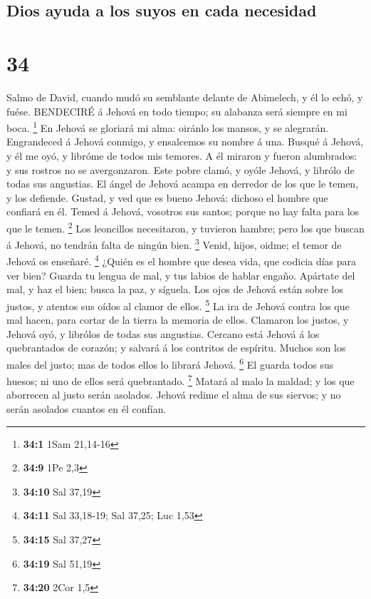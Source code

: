 \hypertarget{dios-ayuda-a-los-suyos-en-cada-necesidad}{%
\subsection{Dios ayuda a los suyos en cada
necesidad}\label{dios-ayuda-a-los-suyos-en-cada-necesidad}}

\hypertarget{section-33}{%
\section{34}\label{section-33}}

 Salmo de David, cuando mudó su semblante delante de
Abimelech, y él lo echó, y fuése. BENDECIRÉ á Jehová en todo tiempo; su
alabanza será siempre en mi boca. \footnote{\textbf{34:1} 1Sam 21,14-16}
 En Jehová se gloriará mi alma: oiránlo los mansos, y se
alegrarán.  Engrandeced á Jehová conmigo, y ensalcemos su
nombre á una.  Busqué á Jehová, y él me oyó, y libróme de
todos mis temores.  A él miraron y fueron alumbrados: y sus
rostros no se avergonzaron.  Este pobre clamó, y oyóle
Jehová, y librólo de todas sus angustias.  El ángel de
Jehová acampa en derredor de los que le temen, y los defiende.
 Gustad, y ved que es bueno Jehová: dichoso el hombre que
confiará en él.  Temed á Jehová, vosotros sus santos; porque
no hay falta para los que le temen. \footnote{\textbf{34:9} 1Pe 2,3}
 Los leoncillos necesitaron, y tuvieron hambre; pero los
que buscan á Jehová, no tendrán falta de ningún bien. \footnote{\textbf{34:10}
  Sal 37,19}  Venid, hijos, oidme; el temor de Jehová os
enseñaré. \footnote{\textbf{34:11} Sal 33,18-19; Sal 37,25; Luc 1,53}
 ¿Quién es el hombre que desea vida, que codicia días para
ver bien?  Guarda tu lengua de mal, y tus labios de hablar
engaño.  Apártate del mal, y haz el bien; busca la paz, y
síguela.  Los ojos de Jehová están sobre los justos, y
atentos sus oídos al clamor de ellos. \footnote{\textbf{34:15} Sal 37,27}
 La ira de Jehová contra los que mal hacen, para cortar de
la tierra la memoria de ellos.  Clamaron los justos, y
Jehová oyó, y librólos de todas sus angustias.  Cercano
está Jehová á los quebrantados de corazón; y salvará á los contritos de
espíritu.  Muchos son los males del justo; mas de todos
ellos lo librará Jehová. \footnote{\textbf{34:19} Sal 51,19}
 El guarda todos sus huesos; ni uno de ellos será
quebrantado. \footnote{\textbf{34:20} 2Cor 1,5}  Matará al
malo la maldad; y los que aborrecen al justo serán asolados.
 Jehová redime el alma de sus siervos; y no serán asolados
cuantos en él confían.

